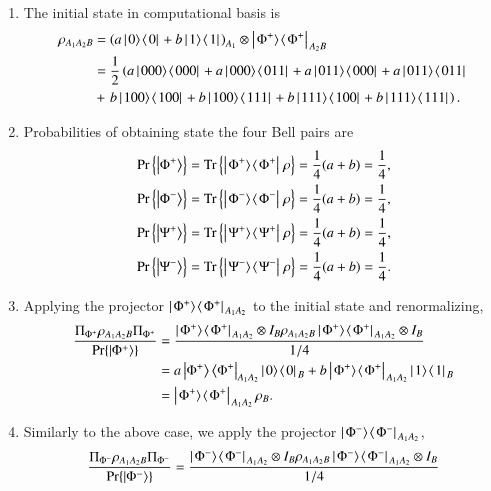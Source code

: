 \begin{solution}
\begin{enumerate}[label=(\alph*)]
    \item The initial state in computational basis is
    \begin{align*}
        \rho_{A_1A_2B} & = \left( a\outp{0}{0} + b\outp{1}{1} \right)_{A_1} \otimes \outp{\Phi^+}{\Phi^+}_{A_2B} \\
        & = \frac{1}{2} \left( a\outp{000}{000} + a\outp{000}{011} + a\outp{011}{000} + a\outp{011}{011} \right. \\
        & + \left. b\outp{100}{100} + b\outp{100}{111} + b\outp{111}{100} + b\outp{111}{111} \right).
    \end{align*}
    \item Probabilities of obtaining state the four Bell pairs are
    \begin{align*}
        \text{Pr}\left\{\left| \Phi^+ \right\rangle\right\} & = \text{Tr}\left\{\left|\left. \Phi^+ \rangle\right.\!\langle\left. \Phi^+ \right|\right. \rho\right\} = \frac{1}{4}(a+b) = \frac{1}{4}, \\
        \text{Pr}\left\{\left| \Phi^- \right\rangle\right\} & = \text{Tr}\left\{\left|\left. \Phi^- \rangle\right.\!\langle\left. \Phi^- \right|\right. \rho\right\} = \frac{1}{4}(a+b) = \frac{1}{4}, \\
        \text{Pr}\left\{\left| \Psi^+ \right\rangle\right\} & = \text{Tr}\left\{\left|\left. \Psi^+ \rangle\right.\!\langle\left. \Psi^+ \right|\right. \rho\right\} = \frac{1}{4}(a+b) = \frac{1}{4}, \\
        \text{Pr}\left\{\left| \Psi^- \right\rangle\right\} & = \text{Tr}\left\{\left|\left. \Psi^- \rangle\right.\!\langle\left. \Psi^- \right|\right. \rho\right\} = \frac{1}{4}(a+b) = \frac{1}{4}.
    \end{align*}
    \item Applying the projector $\left|\left. \Phi^+ \rangle\right.\!\langle\left. \Phi^+ \right|\right. _{A_1A_2}$ to the initial state and renormalizing,
    \begin{align*}
        \frac{\Pi_{\Phi^+}\rho_{A_1A_2B}\Pi_{\Phi^+}}{\text{Pr}\{\left| \Phi^+ \right\rangle\}} & = \frac{\left|\left. \Phi^+ \rangle\right.\!\langle\left. \Phi^+ \right|\right. _{A_1A_2}\otimes I_B \rho_{A_1A_2B}\left|\left. \Phi^+ \rangle\right.\!\langle\left. \Phi^+ \right|\right. _{A_1A_2}\otimes I_B}{1/4} \\
        & = a \left| \Phi^+ \right\rangle\left\langle \Phi^+ \right|_{A_1A_2} \left|\left. 0 \rangle\right.\!\langle\left. 0 \right|\right. _B + b \left|\left. \Phi^+ \rangle\right.\!\langle\left. \Phi^+ \right|\right. _{A_1A_2} \left|\left. 1 \rangle\right.\!\langle\left. 1 \right|\right. _B \\
        & = \left|\left. \Phi^+ \rangle\right.\!\langle\left. \Phi^+ \right|\right. _{A_1A_2}\rho_B.
    \end{align*}
    \item Similarly to the above case, we apply the projector $\left|\left. \Phi^- \rangle\right.\!\langle\left. \Phi^- \right|\right. _{A_1A_2}$,
    \begin{align*}
        \frac{\Pi_{\Phi^-}\rho_{A_1A_2B}\Pi_{\Phi^-}}{\text{Pr}\{\ket{\Phi^-}\}} & = \frac{\outp{\Phi^-}{\Phi^-}_{A_1A_2}\otimes I_B \rho_{A_1A_2B}\outp{\Phi^-}{\Phi^-}_{A_1A_2}\otimes I_B}{1/4} \\

\end{align*}
\end{enumerate}
\end{solution}
